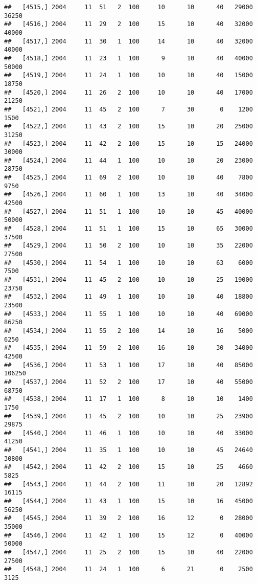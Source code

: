 \documentclass{article}\usepackage[]{graphicx}\usepackage[]{color}
\makeatletter
\newenvironment{kframe}{%
 \def\at@end@of@kframe{}%
 \ifinner\ifhmode%
  \def\at@end@of@kframe{\end{minipage}}%
  \begin{minipage}{\columnwidth}%
 \fi\fi%
 \def\FrameCommand##1{\hskip\@totalleftmargin \hskip-\fboxsep
 \colorbox{shadecolor}{##1}\hskip-\fboxsep
     \hskip-\linewidth \hskip-\@totalleftmargin \hskip\columnwidth}%
 \MakeFramed {\advance\hsize-\width
   \@totalleftmargin\z@ \linewidth\hsize
   \@setminipage}}%
 {\par\unskip\endMakeFramed%
 \at@end@of@kframe}
\newenvironment{knitrout}{}{} %
\makeatother
\begin{document}
\begin{knitrout}
\begin{kframe}
\begin{verbatim}
##   [4515,] 2004     11  51   2  100     10      10      40   29000   36250
##   [4516,] 2004     11  29   2  100     15      10      40   32000   40000
##   [4517,] 2004     11  30   1  100     14      10      40   32000   40000
##   [4518,] 2004     11  23   1  100      9      10      40   40000   50000
##   [4519,] 2004     11  24   1  100     10      10      40   15000   18750
##   [4520,] 2004     11  26   2  100     10      10      40   17000   21250
##   [4521,] 2004     11  45   2  100      7      30       0    1200    1500
##   [4522,] 2004     11  43   2  100     15      10      20   25000   31250
##   [4523,] 2004     11  42   2  100     15      10      15   24000   30000
##   [4524,] 2004     11  44   1  100     10      10      20   23000   28750
##   [4525,] 2004     11  69   2  100     10      10      40    7800    9750
##   [4526,] 2004     11  60   1  100     13      10      40   34000   42500
##   [4527,] 2004     11  51   1  100     10      10      45   40000   50000
##   [4528,] 2004     11  51   1  100     15      10      65   30000   37500
##   [4529,] 2004     11  50   2  100     10      10      35   22000   27500
##   [4530,] 2004     11  54   1  100     10      10      63    6000    7500
##   [4531,] 2004     11  45   2  100     10      10      25   19000   23750
##   [4532,] 2004     11  49   1  100     10      10      40   18800   23500
##   [4533,] 2004     11  55   1  100     10      10      40   69000   86250
##   [4534,] 2004     11  55   2  100     14      10      16    5000    6250
##   [4535,] 2004     11  59   2  100     16      10      30   34000   42500
##   [4536,] 2004     11  53   1  100     17      10      40   85000  106250
##   [4537,] 2004     11  52   2  100     17      10      40   55000   68750
##   [4538,] 2004     11  17   1  100      8      10      10    1400    1750
##   [4539,] 2004     11  45   2  100     10      10      25   23900   29875
##   [4540,] 2004     11  46   1  100     10      10      40   33000   41250
##   [4541,] 2004     11  35   1  100     10      10      45   24640   30800
##   [4542,] 2004     11  42   2  100     15      10      25    4660    5825
##   [4543,] 2004     11  44   2  100     11      10      20   12892   16115
##   [4544,] 2004     11  43   1  100     15      10      16   45000   56250
##   [4545,] 2004     11  39   2  100     16      12       0   28000   35000
##   [4546,] 2004     11  42   1  100     15      12       0   40000   50000
##   [4547,] 2004     11  25   2  100     15      10      40   22000   27500
##   [4548,] 2004     11  24   1  100      6      21       0    2500    3125

\end{verbatim}
\end{kframe}
\end{knitrout}
\end{document}
